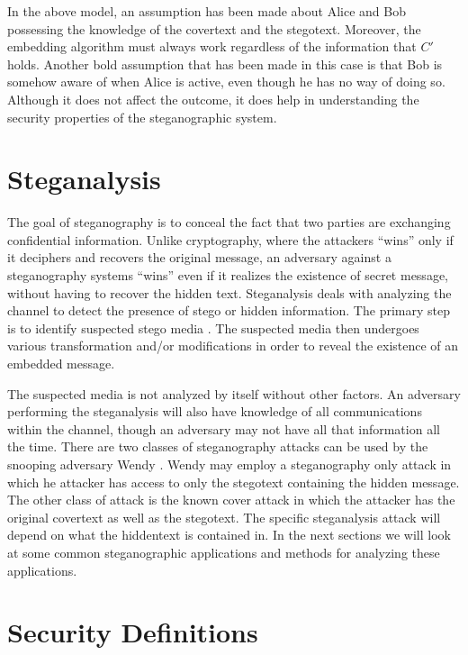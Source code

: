 \documentclass[11pt]{article}
\begin{document}
In the above model, an assumption has been made about Alice and Bob
possessing the knowledge of the covertext and the stegotext. Moreover,
the embedding algorithm must always work regardless of the information
that $C'$ holds. Another bold assumption that has been made in this case
is that Bob is somehow aware of when Alice is active, even though he
has no way of doing so. Although it does not affect the outcome, it
does help in understanding the security properties of the
steganographic system.

\section{Steganalysis} 
The goal of steganography is to conceal the fact that two parties are
exchanging confidential information. Unlike cryptography, where the
attackers ``wins'' only if it deciphers and recovers the original
message, an adversary against a steganography systems ``wins'' even if
it realizes the existence of secret message, without having to recover
the hidden text. Steganalysis deals with analyzing the channel to
detect the presence of stego or hidden information. The primary step
is to identify suspected stego media \cite{Das}. The suspected media then
undergoes various transformation and/or modifications in order to
reveal the existence of an embedded message. 

The suspected media is not analyzed by itself without other factors.
An adversary performing the steganalysis will also have knowledge of
all communications within the channel, though an adversary may not
have all that information all the time. There are two classes of
steganography attacks can be used by the snooping adversary Wendy
\cite{Das}.
Wendy may employ a steganography only attack in which he attacker has
access to only the stegotext containing the hidden message. The other
class of attack is the known cover attack in which the attacker has
the original covertext as well as the stegotext. The specific
steganalysis attack will depend on what the hiddentext is contained
in. In the next sections we will look at some common steganographic
applications and methods for analyzing these applications.

\section{Security Definitions}
\end{document}
